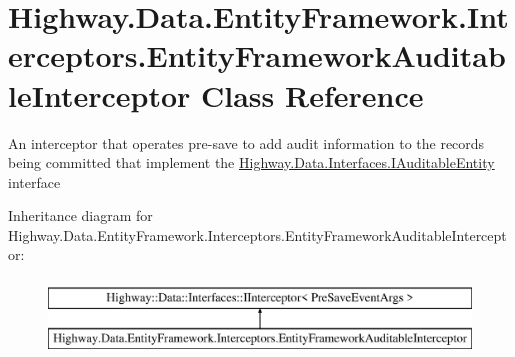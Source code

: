 \hypertarget{class_highway_1_1_data_1_1_entity_framework_1_1_interceptors_1_1_entity_framework_auditable_interceptor}{\section{Highway.\-Data.\-Entity\-Framework.\-Interceptors.\-Entity\-Framework\-Auditable\-Interceptor Class Reference}
\label{class_highway_1_1_data_1_1_entity_framework_1_1_interceptors_1_1_entity_framework_auditable_interceptor}
}


An interceptor that operates pre-\/save to add audit information to the records being committed that implement the \hyperlink{interface_highway_1_1_data_1_1_interfaces_1_1_i_auditable_entity}{Highway.\-Data.\-Interfaces.\-I\-Auditable\-Entity} interface  


Inheritance diagram for Highway.\-Data.\-Entity\-Framework.\-Interceptors.\-Entity\-Framework\-Auditable\-Interceptor\-:\begin{figure}[H]
\begin{center}
\leavevmode
\includegraphics[height=2.000000cm]{class_highway_1_1_data_1_1_entity_framework_1_1_interceptors_1_1_entity_framework_auditable_interceptor}
\end{center}
\end{figure}
